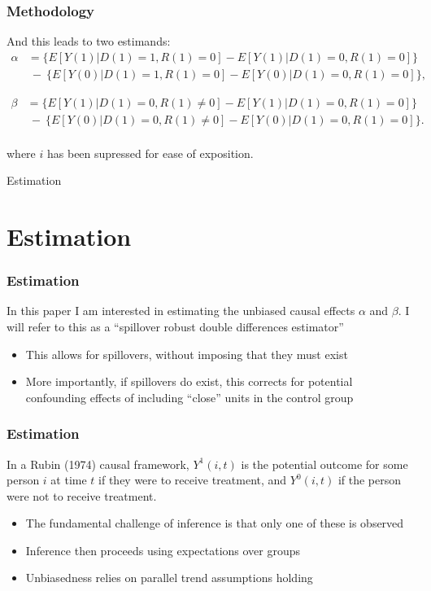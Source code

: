 \documentclass[10pt,letterpaper,subeqn]{beamer}
\begin{document}
\begin{frame}[label=method4]
  \frametitle{Methodology}
And this leads to two estimands:
\begin{eqnarray}
\nonumber
\label{Seqn:DDa}
\alpha&=\{E[Y(1)|D(1)=1,R(1)=0]-E[Y(1)|D(1)=0,R(1)=0]\} \\ \nonumber
      &\ -\ \{E[Y(0)|D(1)=1,R(1)=0]-E[Y(0)|D(1)=0,R(1)=0]\}, 
\end{eqnarray}

\begin{eqnarray}
\nonumber
\beta&=\{E[Y(1)|D(1)=0,R(1)\neq 0]-E[Y(1)|D(1)=0,R(1)=0]\} \\ \nonumber
      &\ -\ \{E[Y(0)|D(1)=0,R(1)\neq 0]-E[Y(0)|D(1)=0,R(1)=0]\}. 
\end{eqnarray}
\vspace{3mm} \\
where $i$ has been supressed for ease of exposition.
\end{frame}

\begin{frame}
\begin{center}
\Large Estimation
\end{center}
\end{frame}


\section{Estimation}
\begin{frame}[label=estim1]
  \frametitle{Estimation}
In this paper I am interested in estimating the unbiased causal effects $\alpha$ 
and $\beta$.  I will refer to this as a ``spillover robust double differences
estimator''
\vspace{4mm}
\begin{itemize}
\item This allows for spillovers, without imposing that they must exist
\item More importantly, if spillovers do exist, this corrects for potential 
confounding effects of including ``close'' units in the control group
\end{itemize}
\end{frame}

\begin{frame}[label=estim2]
  \frametitle{Estimation}
In a Rubin (1974) causal framework, $Y^1(i,t)$ is the potential outcome for some 
person $i$ at time $t$ if they were to receive treatment, and $Y^0(i,t)$ if the 
person were not to receive treatment.
\vspace{4mm}
\begin{itemize}
\item The fundamental challenge of inference is that only one of these is observed
\item Inference then proceeds using expectations over groups
\item Unbiasedness relies on parallel trend assumptions holding
\end{itemize}
\end{frame}
\end{document}

